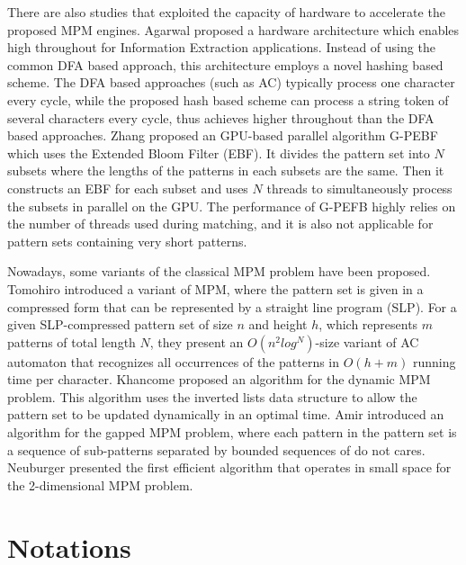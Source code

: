 There are also studies that exploited the capacity of hardware to
accelerate the proposed MPM engines. Agarwal \cite{Agarwal2013}
proposed a hardware architecture which enables high throughout for
Information Extraction applications. Instead of using the common DFA
based approach, this architecture employs a novel hashing based
scheme. The DFA based approaches (such as \textsf{AC}) typically
process one character every cycle, while the proposed hash based
scheme can process a string token of several characters every cycle,
thus achieves higher throughout than the DFA based approaches. Zhang
\cite{Zhang2015} proposed an GPU-based parallel algorithm
\textsf{G-PEBF} which uses the Extended Bloom Filter (EBF). It divides
the pattern set into $N$ subsets where the lengths of the patterns in
each subsets are the same. Then it constructs an EBF for each subset
and uses $N$ threads to simultaneously process the subsets in parallel
on the GPU. The performance of \textsf{G-PEFB} highly relies on the
number of threads used during matching, and it is also not applicable
for pattern sets containing very short patterns.

Nowadays, some variants of the classical MPM problem have been
proposed. Tomohiro \cite{I2015} introduced a variant of MPM, where the
pattern set is given in a compressed form that can be represented by a
straight line program (SLP). For a given SLP-compressed pattern set of
size $n$ and height $h$, which represents $m$ patterns of total length
$N$, they present an $O(n^2log^N)$-size variant of AC automaton that
recognizes all occurrences of the patterns in $O(h + m)$ running time
per character. Khancome \cite{Khancome2013} proposed an algorithm for
the dynamic MPM problem. This algorithm uses the \textsf{inverted
  lists} data structure to allow the pattern set to be updated
dynamically in an optimal time. Amir \cite{Amir2015} introduced an
algorithm for the gapped MPM problem, where each pattern in the
pattern set is a sequence of sub-patterns separated by bounded
sequences of do not cares. Neuburger \cite{Neuburger2012} presented
the first efficient algorithm that operates in small space for the
2-dimensional MPM problem.

\section{Notations}
\label{sec:notations}

